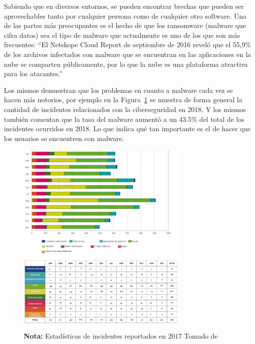 Sabiendo que en diversos entornos, se pueden encontrar brechas que pueden ser
aprovechables tanto por cualquier persona como de cualquier otro software. Una
de las partes más preocupantes es el hecho de que los ransomware (malware que
cifra datos) sea el tipo de malware que actualmente es uno de los que son más
frecuentes: ``El Netskope Cloud Report de septiembre de 2016 reveló que el
55,9\% de los archivos infectados con malware que se encuentran en las
aplicaciones en la nube se comparten públicamente, por lo que la nube es una
plataforma atractiva para los atacantes.'' \parencite{Rosli2019}

Los mismos demuestran que los problemas en cuanto a malware cada
vez se hacen más notorios, por ejemplo en la Figura~\ref{fig:report2017} se
muestra de forma general la cantidad de incidentes relacionados con la
ciberseguridad en 2018. Y los mismos también comentan que la tasa del malware
aumentó a un 43.5\% del total de los incidentes ocurridos en 2018. Lo que indica
qué tan importante es el de hacer que los usuarios se encuentren con malware.

\begin{figure}[htb]
  \centering
  \includegraphics[width=0.75\textwidth]{./pictures/report2017.png}
  \caption{
    \textbf{Nota:} Estadísticas de incidentes reportados en 2017 Tomado de
    \cite{Rosli2019}
  }
  \label{fig:report2017}
\end{figure} 



